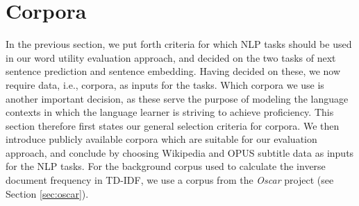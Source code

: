 %
%
%
%
%



\section{Corpora}
In the previous section, we put forth criteria for which NLP tasks should be used in our word utility evaluation approach, and decided on the two tasks of next sentence prediction and sentence embedding.
Having decided on these, we now require data, i.e., corpora, as inputs for the tasks.
Which corpora we use is another important decision, as these serve the purpose of modeling the language contexts in which the language learner is striving to achieve proficiency.
This section therefore first states our general selection criteria for corpora.
We then introduce publicly available corpora which are suitable for our evaluation approach, and conclude by choosing Wikipedia and OPUS subtitle data as inputs for the NLP tasks.
For the background corpus used to calculate the inverse document frequency in TD-IDF, we use a corpus from the \textit{Oscar} project (see Section \ref{sec:oscar}).

